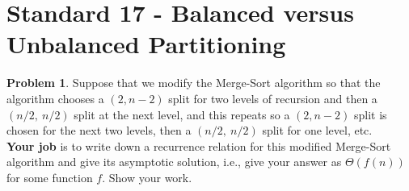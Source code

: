 \documentclass[11pt]{article}
\theoremstyle{definition}
\theoremstyle{definition}
\newtheorem{required}{Problem}
\theoremstyle{definition}
\begin{document}
\newpage
\section{Standard 17 - Balanced versus Unbalanced Partitioning}
\begin{required}
Suppose that we modify the Merge-Sort algorithm so that the algorithm chooses a $(2, n-2)$ split for two levels of recursion and then a $(n/2,~n/2)$ split at the next level,  and this repeats so  a $(2, n-2)$ split is chosen for the next two levels, then a $(n/2,~n/2)$ split for one level, etc. \\

\noindent \textbf{Your job} is to write down a recurrence relation for this modified Merge-Sort algorithm and give its asymptotic solution, i.e., give your answer as $\Theta(f(n))$ for some function $f$. Show your work.\end{required}
\end{document}
